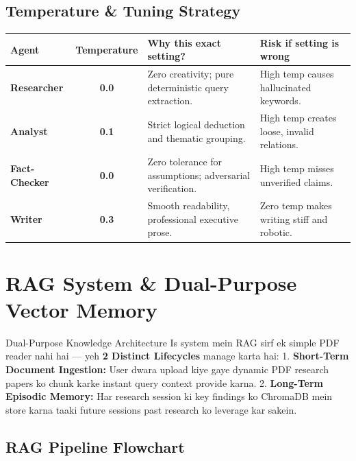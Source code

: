 \documentclass[9.5pt, a4paper]{article}
\begin{document}
\subsection{Temperature \& Tuning Strategy}
\begin{table}[H]
\centering
\scriptsize
\begin{tabularx}{\textwidth}{l c l X}
\toprule
\rowcolor{primary!10}
\textbf{Agent} & \textbf{Temperature} & \textbf{Why this exact setting?} & \textbf{Risk if setting is wrong} \\
\midrule
\textbf{Researcher} & \textbf{0.0} & Zero creativity; pure deterministic query extraction. & High temp causes hallucinated keywords. \\
\textbf{Analyst} & \textbf{0.1} & Strict logical deduction and thematic grouping. & High temp creates loose, invalid relations. \\
\textbf{Fact-Checker} & \textbf{0.0} & Zero tolerance for assumptions; adversarial verification. & High temp misses unverified claims. \\
\textbf{Writer} & \textbf{0.3} & Smooth readability, professional executive prose. & Zero temp makes writing stiff and robotic. \\
\bottomrule
\end{tabularx}
\end{table}

\clearpage
\section{RAG System \& Dual-Purpose Vector Memory}

\begin{conceptbox}{Dual-Purpose Knowledge Architecture}
Is system mein RAG sirf ek simple PDF reader nahi hai — yeh \textbf{2 Distinct Lifecycles} manage karta hai:
1. \textbf{Short-Term Document Ingestion:} User dwara upload kiye gaye dynamic PDF research papers ko chunk karke instant query context provide karna.
2. \textbf{Long-Term Episodic Memory:} Har research session ki key findings ko ChromaDB mein store karna taaki future sessions past research ko leverage kar sakein.
\end{conceptbox}

\vspace{-4pt}
\subsection{RAG Pipeline Flowchart}
\end{document}
